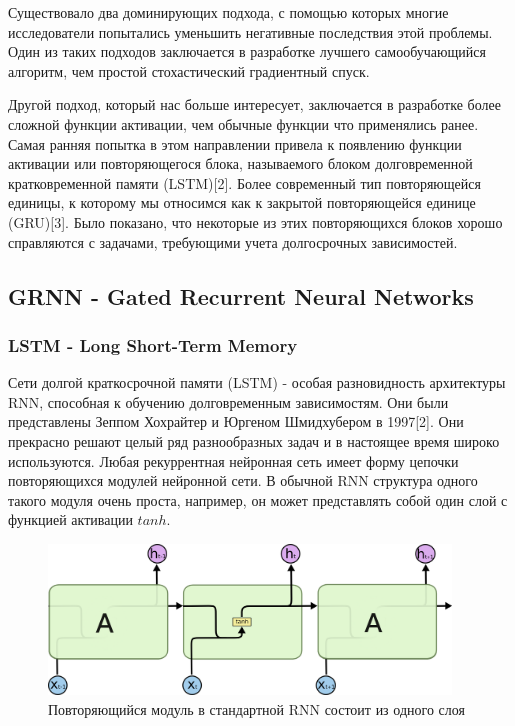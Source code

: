 	Существовало два доминирующих подхода, с помощью которых многие исследователи попытались уменьшить негативные последствия этой проблемы. Один из таких подходов заключается в разработке лучшего самообучающийся алгоритм, чем простой стохастический градиентный спуск.
	
	Другой подход, который нас больше интересует, заключается в разработке более сложной функции активации, чем обычные функции что применялись ранее. Самая ранняя попытка в этом направлении привела к появлению функции активации или повторяющегося блока, называемого блоком долговременной кратковременной памяти (LSTM)[2]. Более современный тип повторяющейся единицы, к которому мы относимся как к закрытой повторяющейся единице (GRU)[3]. Было показано, что некоторые из этих повторяющихся блоков хорошо справляются с задачами, требующими учета долгосрочных зависимостей.
	
	\subsection{GRNN - Gated Recurrent Neural Networks}
	\subsubsection{LSTM - Long Short-Term Memory}
	
	Сети долгой краткосрочной памяти (LSTM) - особая разновидность архитектуры RNN, способная к обучению долговременным зависимостям. Они были представлены Зеппом Хохрайтер и Юргеном Шмидхубером в 1997[2]. Они прекрасно решают целый ряд разнообразных задач и в настоящее время широко используются. Любая рекуррентная нейронная сеть имеет форму цепочки повторяющихся модулей нейронной сети. В обычной RNN структура одного такого модуля очень проста, например, он может представлять собой один слой с функцией активации $tanh$. 
	
	\begin{figure}[ht!]
		\centering
		\captionsetup{justification=centering}
		\includegraphics[height=40mm]{img/RNN Chain.png}
		\caption{Повторяющийся модуль в стандартной RNN состоит из одного слоя}
	\end{figure}
	
